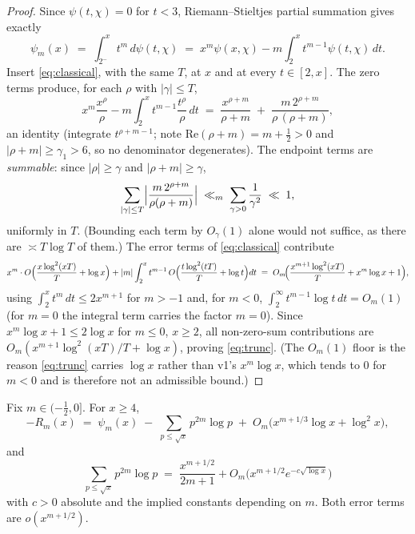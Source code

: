 \begin{proof}
Since $\psi(t,\chi)=0$ for $t<3$, Riemann--Stieltjes partial summation
gives exactly
\[
\psi_m(x)\;=\;\int_{2^-}^{x}t^m\,d\psi(t,\chi)
\;=\;x^m\psi(x,\chi)-m\int_2^x t^{m-1}\psi(t,\chi)\,dt .
\]
Insert \eqref{eq:classical}, with the same $T$, at $x$ and at every
$t\in[2,x]$. The zero terms produce, for each $\rho$ with
$|\gamma|\le T$,
\[
x^m\frac{x^{\rho}}{\rho}-m\int_2^x t^{m-1}\frac{t^{\rho}}{\rho}\,dt
\;=\;\frac{x^{\rho+m}}{\rho+m}
\;+\;\frac{m\,2^{\rho+m}}{\rho\,(\rho+m)},
\]
an identity (integrate $t^{\rho+m-1}$; note
$\mathrm{Re}(\rho+m)=m+\tfrac12>0$ and $|\rho+m|\ge\gamma_1>6$, so no
denominator degenerates). The endpoint terms are \emph{summable}: since
$|\rho|\ge\gamma$ and $|\rho+m|\ge\gamma$,
\[
\sum_{|\gamma|\le T}\Bigl|\frac{m\,2^{\rho+m}}{\rho(\rho+m)}\Bigr|
\;\ll_m\;\sum_{\gamma>0}\frac{1}{\gamma^{2}}\;\ll\;1,
\]
uniformly in $T$. (Bounding each term by $O_\gamma(1)$ alone would not
suffice, as there are $\asymp T\log T$ of them.) The error terms of
\eqref{eq:classical} contribute
\[
x^m\cdot O\Bigl(\frac{x\log^2(xT)}{T}+\log x\Bigr)
+|m|\int_2^x t^{m-1}\,O\Bigl(\frac{t\log^2(tT)}{T}+\log t\Bigr)dt
\;=\;O_m\!\Bigl(\frac{x^{m+1}\log^2(xT)}{T}+x^m\log x+1\Bigr),
\]
using $\int_2^x t^m\,dt\le 2x^{m+1}$ for $m>-1$ and, for $m<0$,
$\int_2^\infty t^{m-1}\log t\,dt=O_m(1)$ (for $m=0$ the integral term
carries the factor $m=0$). Since $x^m\log x+1\le 2\log x$ for
$m\le 0$, $x\ge2$, all non-zero-sum contributions are
$O_m(x^{m+1}\log^2(xT)/T+\log x)$, proving \eqref{eq:trunc}. (The
$O_m(1)$ floor is the reason \eqref{eq:trunc} carries $\log x$ rather
than v1's $x^m\log x$, which tends to $0$ for $m<0$ and is therefore
not an admissible bound.)
\end{proof}

\begin{lemma}\label{lem:squares}
Fix $m\in(-\tfrac12,0]$. For $x\ge4$,
\[
-R_m(x)\;=\;\psi_m(x)\;-\;\sum_{p\le\sqrt x}p^{2m}\log p
\;+\;O_m\!\bigl(x^{m+1/3}\log x+\log^2x\bigr),
\]
and
\[
\sum_{p\le\sqrt x}p^{2m}\log p\;=\;\frac{x^{m+1/2}}{2m+1}
+O_m\!\bigl(x^{m+1/2}e^{-c\sqrt{\log x}}\bigr)
\]
with $c>0$ absolute and the implied constants depending on $m$. Both
error terms are $o(x^{m+1/2})$.
\end{lemma}

